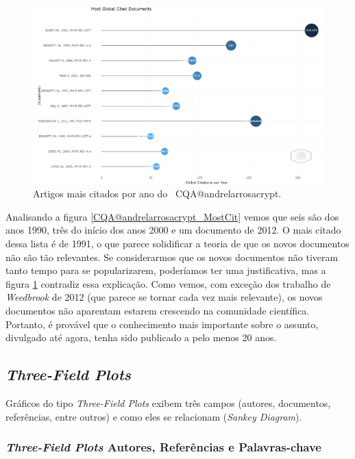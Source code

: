 \begin{figure}
    \centering
    \includegraphics[width=1\textwidth]{experiments/andrelarrosacrypt/AnaliseBibliometrica/CriptografiaQuantica/imagens/CQA@andrelarrosacrypt_MostCit2.png}
    \caption{Artigos mais citados por ano do \dataset\ CQA@andrelarrosacrypt.}
    \label{CQA@andrelarrosacrypt_MostCit2}
\end{figure}

Analisando a figura \ref{CQA@andrelarrosacrypt_MostCit} vemos que seis são dos anos 1990, três do início dos anos 2000 e um documento de 2012. O mais citado dessa lista é de 1991, o que parece solidificar a teoria de que os novos documentos não são tão relevantes. Se considerarmos que os novos documentos não tiveram tanto tempo para se popularizarem, poderíamos ter uma justificativa, mas a figura \ref{CQA@andrelarrosacrypt_MostCit2} contradiz essa explicação. Como vemos, com exceção dos trabalho de \textit{Weedbrook} de 2012 (que parece se tornar cada vez mais relevante), os novos documentos não aparentam estarem crescendo na comunidade científica. Portanto, é provável que o conhecimento mais importante sobre o assunto, divulgado até agora, tenha sido publicado a pelo menos 20 anos.

\subsection{\textit{Three-Field Plots}}

Gráficos do tipo \textit{Three-Field Plots} exibem três campos (autores, documentos, referências, entre outros) e como eles se relacionam (\textit{Sankey Diagram}).

\subsubsection{\textit{Three-Field Plots} Autores, Referências e Palavras-chave}

